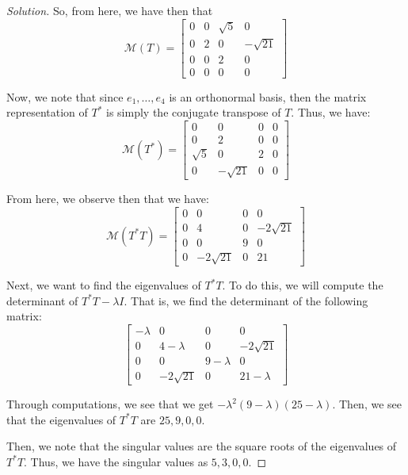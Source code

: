 \documentclass{article}
\newenvironment{solution}{\begin{proof}[Solution]}{\end{proof}}
\begin{document}
\begin{solution}
	So, from here, we have then that
	\begin{equation*}
		\mathcal{M}(T) = \begin{bmatrix}
			0 & 0 & \sqrt{5} & 0 \\ 0 & 2 & 0 & -\sqrt{21} \\ 0 & 0 & 2 & 0 \\ 0 & 0 & 0 & 0
		\end{bmatrix}
	\end{equation*}
	
	Now, we note that since $e_{1}, \ldots, e_{4}$ is an orthonormal basis, then the matrix representation of $T^{*}$ is simply the conjugate transpose of $T$. Thus, we have:
	\begin{equation*}
		\mathcal{M}(T^{*}) = \begin{bmatrix}
			0 & 0 & 0 & 0 \\ 0 & 2 & 0 & 0 \\ \sqrt{5} & 0 & 2 & 0 \\ 0 & -\sqrt{21} & 0 & 0
		\end{bmatrix}
	\end{equation*}

	From here, we observe then that we have:
	\begin{equation*}
		\mathcal{M}(T^{*}T) = \begin{bmatrix}
			0 & 0 & 0 & 0 \\
			0 & 4 & 0 & -2\sqrt{21} \\
			0 & 0 & 9 & 0 \\
			0 & -2\sqrt{21} & 0 & 21
		\end{bmatrix}
	\end{equation*}

	Next, we want to find the eigenvalues of $T^{*}T$. To do this, we will compute the determinant of $T^{*}T - \lambda I$. That is, we find the determinant of the following matrix:
	\begin{equation*}
		\begin{bmatrix}
			-\lambda & 0 & 0 & 0 \\
			0 & 4-\lambda & 0 & -2\sqrt{21} \\
			0 & 0 & 9-\lambda & 0 \\
			0 & -2\sqrt{21} & 0 & 21-\lambda
		\end{bmatrix}
	\end{equation*}

	Through computations, we see that we get $-\lambda^{2}(9-\lambda)(25 - \lambda)$. Then, we see that the eigenvalues of $T^{*}T$ are $25, 9, 0, 0$.
	
	Then, we note that the singular values are the square roots of the eigenvalues of $T^{*}T$. Thus, we have the singular values as $5, 3, 0, 0$.
\end{solution}
\end{document}
